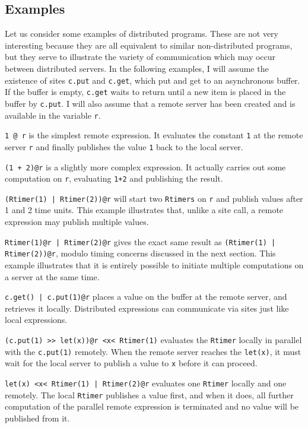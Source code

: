 \documentclass[10pt,letterpaper]{article}
\begin{document}
\subsection{Examples}

Let us consider some examples of distributed programs. These are not very
interesting because they are all equivalent to similar non-distributed
programs, but they serve to illustrate the variety of communication which may
occur between distributed servers.  In the following examples, I will assume
the existence of sites \texttt{c.put} and \texttt{c.get}, which put and get to
an asynchronous buffer. If the buffer is empty, \texttt{c.get} waits to return
until a new item is placed in the buffer by \texttt{c.put}. I will also assume
that a remote server has been created and is available in the variable
\texttt{r}.

\texttt{1 @ r} is the simplest remote expression. It evaluates the constant
\texttt{1} at the remote server \texttt{r} and finally publishes the value
\texttt{1} back to the local server.

\texttt{(1 + 2)@r} is a slightly more complex expression. It actually carries
out some computation on \texttt{r}, evaluating \texttt{1+2} and publishing the
result.

\texttt{(Rtimer(1) | Rtimer(2))@r} will start two \texttt{Rtimers} on
\texttt{r} and publish values after 1 and 2 time units. This example
illustrates that, unlike a site call, a remote expression may publish multiple
values.

\texttt{Rtimer(1)@r | Rtimer(2)@r} gives the exact same result as
\texttt{(Rtimer(1) | Rtimer(2))@r}, modulo timing concerns discussed in the
next section. This example illustrates that it is entirely possible to initiate
multiple computations on a server at the same time.

\texttt{c.get() | c.put(1)@r} places a value on the buffer at the remote
server, and retrieves it locally. Distributed expressions can communicate via
sites just like local expressions.

\texttt{(c.put(1) >> let(x))@r <x< Rtimer(1)} evaluates the \texttt{Rtimer}
locally in parallel with the \texttt{c.put(1)} remotely. When the remote
server reaches the \texttt{let(x)}, it must wait for the local server to
publish a value to \texttt{x} before it can proceed.

\texttt{let(x) <x< Rtimer(1) | Rtimer(2)@r} evaluates one \texttt{Rtimer}
locally and one remotely. The local \texttt{Rtimer} publishes a value first,
and when it does, all further computation of the parallel remote expression is
terminated and no value will be published from it.
\end{document}
